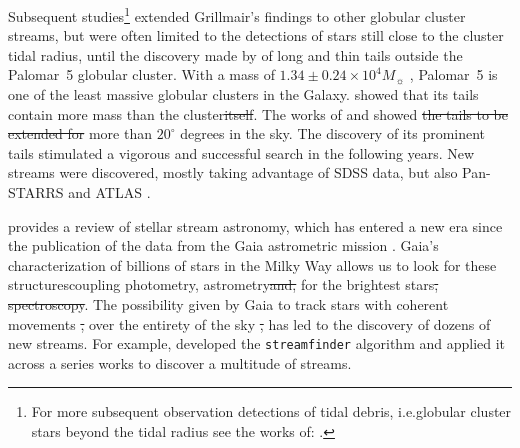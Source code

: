 \documentclass{aa} %
\providecommand{\DIFaddtex}[1]{{\protect\color{blue}\uwave{#1}}} %
\providecommand{\DIFdeltex}[1]{{\protect\color{red}\sout{#1}}}                      %
\providecommand{\DIFaddbegin}{} %
\providecommand{\DIFaddend}{} %
\providecommand{\DIFdelbegin}{} %
\providecommand{\DIFdelend}{} %
\providecommand{\DIFadd}[1]{\texorpdfstring{\DIFaddtex{#1}}{#1}} %
\providecommand{\DIFdel}[1]{\texorpdfstring{\DIFdeltex{#1}}{}} %
\begin{document}
  Subsequent studies\footnote{For more subsequent observation detections of tidal debris, i.e.\DIFaddbegin \DIFadd{, }\DIFaddend globular cluster stars beyond the tidal radius see the works of: \citet{1997A&A...320..776L, 2000A&A...356..127T, 2000A&A...359..907L, 2001AAS...19910906S, 2003AJ....126..815L,2011ApJ...726...47S,2018MNRAS.476.4814S,2020MNRAS.495.2222S}.} extended Grillmair's findings to other globular cluster streams, but were often limited to the detections of stars still close to the cluster tidal radius, until the discovery made by \citet{2001ApJ...548L.165O,2002AAS...200.1001O, 2003AJ....126.2385O} of long and thin tails outside the Palomar~5 globular cluster. With a mass of $1.34\pm 0.24 \times 10^4 M_{\sun}$ \citep{2019MNRAS.482.5138B}, Palomar~5 is one of the least massive globular clusters in the Galaxy. \citet{2003AJ....126.2385O} showed that its tails contain more mass than the cluster\DIFdelbegin \DIFdel{itself}\DIFdelend . The works of \citet{2006ApJ...641L..37G} and \citet{2015MNRAS.446.3297K} showed \DIFdelbegin \DIFdel{the tails to be extended for }\DIFdelend \DIFaddbegin \DIFadd{that the tails have an extent of }\DIFaddend more than $20^\circ$ degrees in the sky. The discovery of its prominent tails stimulated a vigorous and successful search in the following years. New streams were discovered, mostly taking advantage of SDSS data, but also Pan-STARRS and ATLAS  \citep{2006ApJ...643L..17G, 2006ApJ...637L..29B, 2009ApJ...693.1118G, 2012ApJ...760L...6B, 2013ApJ...769L..23G, 2014ApJ...790L..10G, 2015ApJ...812L..26G, 2014MNRAS.443L..84B, 2016MNRAS.463.1759B, 2017ApJ...847..119G, 2014MNRAS.442L..85K}. 

  
  \citet{2025NewAR.10001713B} provides a review of stellar stream astronomy, which has entered a new era since the publication of the data from the Gaia astrometric mission \citep{2016A&A...595A...1G}. Gaia's characterization of billions of stars in the Milky Way allows us to look for these structures\DIFaddbegin \DIFadd{, }\DIFaddend coupling photometry, astrometry\DIFdelbegin \DIFdel{and, }\DIFdelend \DIFaddbegin \DIFadd{, and spectroscopy }\DIFaddend for the brightest stars\DIFdelbegin \DIFdel{, spectroscopy}\DIFdelend . The possibility given by Gaia to track stars with coherent movements \DIFdelbegin \DIFdel{, }\DIFdelend over the entirety of the sky \DIFdelbegin \DIFdel{, }\DIFdelend has led to the discovery of dozens of new streams. For example, \citet{2018MNRAS.477.4063M} developed the \texttt{streamfinder} algorithm and applied it across a series \DIFaddbegin \DIFadd{of }\DIFaddend works \citep{2018MNRAS.481.3442M,  2018ApJ...865...85I, 2019ApJ...872..152I} to discover a multitude of streams.
\end{document}
